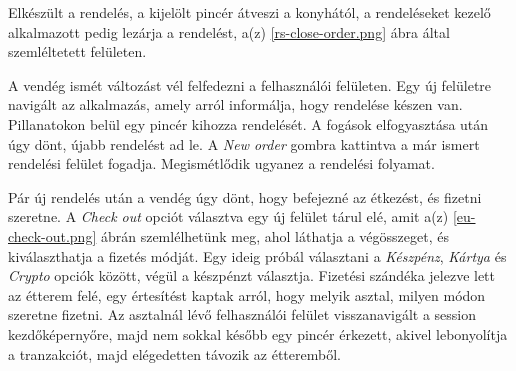 Elkészült a rendelés, a kijelölt pincér átveszi a konyhától, a rendeléseket kezelő alkalmazott pedig lezárja a rendelést, a(z) \ref{rs-close-order.png} ábra által szemléltetett felületen.

A vendég ismét változást vél felfedezni a felhasználói felületen. Egy új felületre navigált az alkalmazás, amely arról informálja, hogy rendelése készen van. Pillanatokon belül egy pincér kihozza rendelését. A fogások elfogyasztása után úgy dönt, újabb rendelést ad le. A \emph{New order} gombra kattintva a már ismert rendelési felület fogadja. Megismétlődik ugyanez a rendelési folyamat. \par


Pár új rendelés után a vendég úgy dönt, hogy befejezné az étkezést, és fizetni szeretne. A \emph{Check out} opciót választva egy új felület tárul elé, amit a(z) \ref{eu-check-out.png} ábrán szemlélhetünk meg, ahol láthatja a végösszeget, és kiválaszthatja a fizetés módját. Egy ideig próbál választani a \emph{Készpénz}, \emph{Kártya} és \emph{Crypto} opciók között, végül a készpénzt választja. Fizetési szándéka jelezve lett az étterem felé, egy értesítést kaptak arról, hogy melyik asztal, milyen módon szeretne fizetni. Az asztalnál lévő felhasználói felület visszanavigált a session kezdőképernyőre, majd nem sokkal később egy pincér érkezett, akivel lebonyolítja a tranzakciót, majd elégedetten távozik az étteremből.

